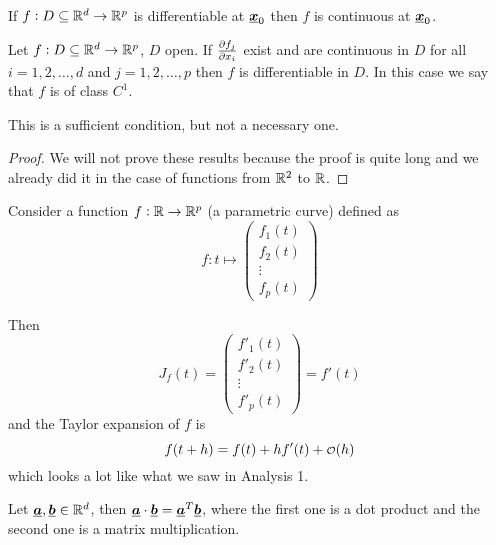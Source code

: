 \documentclass[12pt]{extarticle}
\renewcommand{\vec}[1]{\uvec{#1}}
\begin{document}
\begin{proposition}
    If $f: D \subseteq \mathbb{R}^d \to \mathbb{R}^p$ is differentiable at $\vec{x}_0$ then $f$ is continuous at $\vec{x}_0$.
\end{proposition}

\begin{theorem}
    Let $f: D \subseteq \mathbb{R}^d \to \mathbb{R}^p$, $D$ open. If $\pdv{f_j}{x_i}()$ exist and are continuous in $D$ for all $i = 1, 2, \ldots, d$ and $j = 1, 2, \ldots, p$ then $f$ is differentiable in $D$.
    In this case we say that $f$ is of class $C^1$.
\end{theorem}
\begin{remark}
    This is a sufficient condition, but not a necessary one.
\end{remark}

\begin{proof}
    We will not prove these results because the proof is quite long and we already did it in the case of functions from $\mathbb{R}^2$ to $\mathbb{R}$.
\end{proof}

\begin{example}
    Consider a function $f: \mathbb{R} \to \mathbb{R}^p$ (a parametric curve) defined as
    \begin{equation}
        f : t \mapsto \begin{pmatrix}
            f_1(t) \\
            f_2(t) \\
            \vdots \\
            f_p(t)
        \end{pmatrix}
    \end{equation}

    Then
    \begin{equation}
        J_f(t) = \begin{pmatrix}
            f'_1(t) \\
            f'_2(t) \\
            \vdots  \\
            f'_p(t)
        \end{pmatrix} = f'(t)
    \end{equation}
    and the Taylor expansion of $f$ is
    \begin{equation}
        f(t + h) = f(t) + h f'(t) + \o(h)
    \end{equation}
    which looks a lot like what we saw in Analysis 1.
\end{example}
\begin{remark}
    Let $\vec{a}, \vec{b} \in \R^d$, then $\vec{a} \cdot \vec{b} = \vec{a}^T \vec{b}$, where the first one is a dot product and the second one is a matrix multiplication.
\end{remark}
\end{document}
